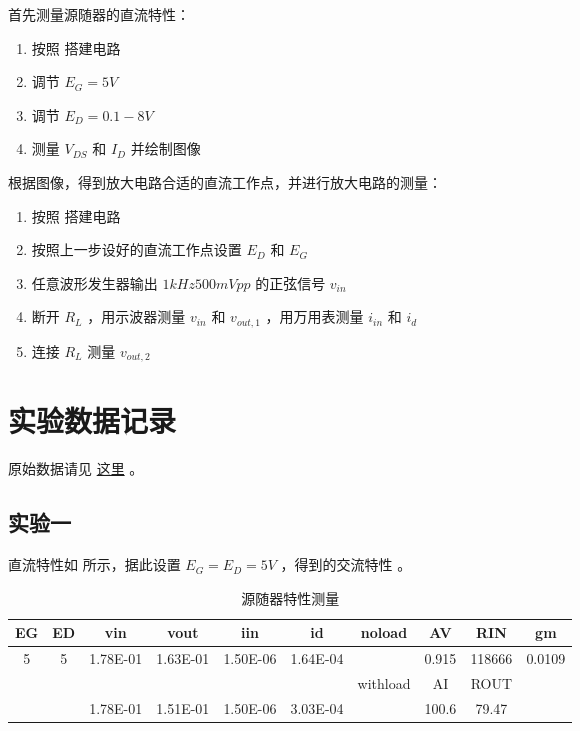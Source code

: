 \documentclass[lang=cn,11pt,a4paper,cite=authoryear]{elegantpaper}
\begin{document}
首先测量源随器的直流特性： 

\begin{enumerate}
    \item 按照  搭建电路
    \item 调节 \(E_G = 5 V\) 
    \item 调节 \(E_D = 0.1 - 8 V\) 
    \item 测量 \(V_{DS}\) 和 \(I_D\) 并绘制图像
\end{enumerate}


根据图像，得到放大电路合适的直流工作点，并进行放大电路的测量：

\begin{enumerate}
    \item 按照  搭建电路
    \item 按照上一步设好的直流工作点设置 \(E_D\) 和 \(E_G\) 
    \item 任意波形发生器输出 \(1 kHz 500 m Vpp\)  的正弦信号 \(v_{in}\) 
    \item 断开 \(R_L\) ，用示波器测量 \(v_{in}\) 和 \(v_{out,1}\) ，用万用表测量 \(i_{in}\) 和 \(i_d\) 
    \item 连接 \(R_L\) 测量 \(v_{out,2}\)
\end{enumerate}



\section{实验数据记录}



原始数据请见 \href{https://github.com/PannenetsF/Mirco-Electronic-Device-Experiment/tree/main/homework/hw13}{这里} 。

\subsection{实验一}


直流特性如  所示，据此设置 \(E_G = E_D = 5 V\) ，得到的交流特性  。

\begin{table}[htb]
    \centering
    \caption{源随器特性测量}
    \label{t1}
    \begin{tabular}{|c|c|c|c|c|c|c|c|c|c|}
    \hline
    EG & ED & vin      & vout     & iin      & id       & noload   & AV          & RIN         & gm          \\ \hline
    5  & 5  & 1.78E-01 & 1.63E-01 & 1.50E-06 & 1.64E-04 &          & 0.915 & 118666 & 0.0109 \\ \hline
       &    &          &          &          &          & withload & AI          & ROUT        &             \\ \hline
       &    & 1.78E-01 & 1.51E-01 & 1.50E-06 & 3.03E-04 &          & 100.6 & 79.47 &             \\ \hline
    \end{tabular}
\end{table}
\end{document}
